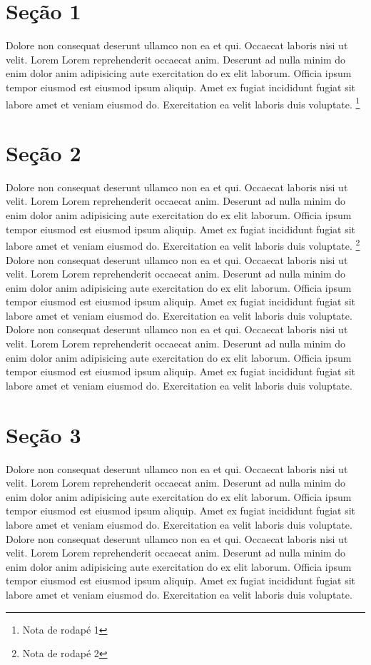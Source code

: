 \documentclass[12pt]{report}
\begin{document}
\section{Seção 1}

Dolore non consequat deserunt ullamco non ea et qui. Occaecat laboris nisi ut velit. Lorem Lorem reprehenderit occaecat anim. Deserunt ad nulla minim do enim dolor anim adipisicing aute exercitation do ex elit laborum. Officia ipsum tempor eiusmod est eiusmod ipsum aliquip. Amet ex fugiat incididunt fugiat sit labore amet et veniam eiusmod do. Exercitation ea velit laboris duis voluptate. \footnote{Nota de rodapé 1}

\section{Seção 2}

Dolore non consequat deserunt ullamco non ea et qui. Occaecat laboris nisi ut velit. Lorem Lorem reprehenderit occaecat anim. Deserunt ad nulla minim do enim dolor anim adipisicing aute exercitation do ex elit laborum. Officia ipsum tempor eiusmod est eiusmod ipsum aliquip. Amet ex fugiat incididunt fugiat sit labore amet et veniam eiusmod do. Exercitation ea velit laboris duis voluptate. \footnote{Nota de rodapé 2}
Dolore non consequat deserunt ullamco non ea et qui. Occaecat laboris nisi ut velit. Lorem Lorem reprehenderit occaecat anim. Deserunt ad nulla minim do enim dolor anim adipisicing aute exercitation do ex elit laborum. Officia ipsum tempor eiusmod est eiusmod ipsum aliquip. Amet ex fugiat incididunt fugiat sit labore amet et veniam eiusmod do. Exercitation ea velit laboris duis voluptate.
Dolore non consequat deserunt ullamco non ea et qui. Occaecat laboris nisi ut velit. Lorem Lorem reprehenderit occaecat anim. Deserunt ad nulla minim do enim dolor anim adipisicing aute exercitation do ex elit laborum. Officia ipsum tempor eiusmod est eiusmod ipsum aliquip. Amet ex fugiat incididunt fugiat sit labore amet et veniam eiusmod do. Exercitation ea velit laboris duis voluptate.

\section{Seção 3}

Dolore non consequat deserunt ullamco non ea et qui. Occaecat laboris nisi ut velit. Lorem Lorem reprehenderit occaecat anim. Deserunt ad nulla minim do enim dolor anim adipisicing aute exercitation do ex elit laborum. Officia ipsum tempor eiusmod est eiusmod ipsum aliquip. Amet ex fugiat incididunt fugiat sit labore amet et veniam eiusmod do. Exercitation ea velit laboris duis voluptate.
Dolore non consequat deserunt ullamco non ea et qui. Occaecat laboris nisi ut velit. Lorem Lorem reprehenderit occaecat anim. Deserunt ad nulla minim do enim dolor anim adipisicing aute exercitation do ex elit laborum. Officia ipsum tempor eiusmod est eiusmod ipsum aliquip. Amet ex fugiat incididunt fugiat sit labore amet et veniam eiusmod do. Exercitation ea velit laboris duis voluptate.
\end{document}

